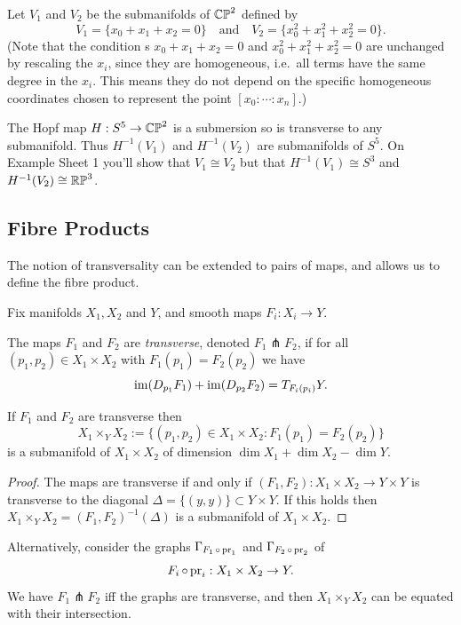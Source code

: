 \documentclass[a4paper,11pt]{article}
\begin{document}
	\begin{ex}
		Let $V_1$ and $V_2$ be the submanifolds of $\mathbb{CP}^{2}$ defined by
		\[
			V_1 = \{x_0 + x_1 + x_2 = 0\} \quad \text{and} \quad V_2 = \{x_0^2 + x_1^2 + x_2^2 = 0\}.
		\]
		(Note that the condition s $x_0 + x_1 + x_2 = 0$ and $x_0^2 + x_1^2 + x_2^2 = 0$ are unchanged by rescaling the $x_i$, since they are homogeneous, i.e.\ all terms have the same degree in the $x_i$. This means they do not depend on the specific homogeneous coordinates chosen to represent the point $[x_0 : \cdots : x_n]$.)

		The Hopf map $H : S^5 \to \mathbb{CP}^{2}$ is a submersion so is transverse to any submanifold. Thus $H^{-1}(V_1)$ and $H^{-1}(V_2)$ are submanifolds of $S^5$. On Example Sheet 1 you'll show that $V_1 \cong V_2$ but that $H^{-1}(V_1) \cong S^3$ and $H^{-1}(V_2)\cong \mathbb{RP}^{3}$.
	\end{ex}

	\subsection{Fibre Products} 

	The notion of transversality can be extended to pairs of maps, and allows us to define the fibre product.

	Fix manifolds $X_1, X_2$ and $Y$, and smooth maps $F_i : X_i \to Y$.

	\begin{defi}
		The maps $F_1$ and $F_2$ are \emph{transverse}, denoted $F_1 \pitchfork F_2$, if for all $(p_1,p_2)\in X_1 \times X_2$ with $F_1(p_1)=F_2(p_2)$ we have
		\[
			\operatorname{im}(D _{p_1} F_1) + \operatorname{im}(D _{p_2} F_2) = T _{F_i(p_i)} Y.
		\]
	\end{defi}

	\begin{prop}
		If $F_1$ and $F_2$ are transverse then
		\[
			X_1 \times_Y X_2 := \{(p_1,p_2)\in X_1 \times X_2 : F_1(p_1) = F_2(p_2)\}
		\]
		is a submanifold of $X_1 \times X_2$ of dimension $\dim X_1 + \dim X_2 - \dim Y$.
	\end{prop}

	\begin{proof}
		The maps are transverse if and only if $(F_1,F_2): X_1 \times X_2 \to Y \times Y$ is transverse to the diagonal $\Delta = \{(y,y)\} \subset Y \times Y$. If this holds then $X_1 \times_Y X_2 = (F_1,F_2)^{-1}(\Delta)$ is a submanifold of $X_1 \times X_2$. 
	\end{proof}

	Alternatively, consider the graphs $\Gamma _{F_1 \operatorname{\circ} \text{pr}_1}$ and $\Gamma _{F_2 \operatorname{\circ} \text{pr}_2}$ of
	\[
		F_i \operatorname{\circ} \text{pr}_i : X_1 \times X_2 \to Y.
	\]
	We have $F_1 \pitchfork F_2$ iff the graphs are transverse, and then $X_1 \times_Y X_2$ can be equated with their intersection.
\end{document}
